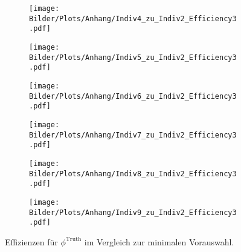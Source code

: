 \begin{figure}
  \begin{subfigure}[t]{0.5\textwidth}
  \texttt{[image: Bilder/Plots/Anhang/Indiv4\_zu\_Indiv2\_Efficiency3.pdf]}
  \end{subfigure}
\begin{subfigure}[t]{0.5\textwidth}
 \texttt{[image: Bilder/Plots/Anhang/Indiv5\_zu\_Indiv2\_Efficiency3.pdf]}
\end{subfigure}
\begin{subfigure}[t]{0.5\textwidth}
  \texttt{[image: Bilder/Plots/Anhang/Indiv6\_zu\_Indiv2\_Efficiency3.pdf]}
\end{subfigure}
\begin{subfigure}[t]{0.5\textwidth}
  \texttt{[image: Bilder/Plots/Anhang/Indiv7\_zu\_Indiv2\_Efficiency3.pdf]}
\end{subfigure}
\begin{subfigure}[t]{0.5\textwidth}
  \texttt{[image: Bilder/Plots/Anhang/Indiv8\_zu\_Indiv2\_Efficiency3.pdf]}
\end{subfigure}
\begin{subfigure}[t]{0.5\textwidth}
  \texttt{[image: Bilder/Plots/Anhang/Indiv9\_zu\_Indiv2\_Efficiency3.pdf]}
\end{subfigure}
\caption{Effizienzen für $\phi^{\text{Truth}}$ im Vergleich zur minimalen Vorauswahl.}
\end{figure}
\clearpage
\clearpage
